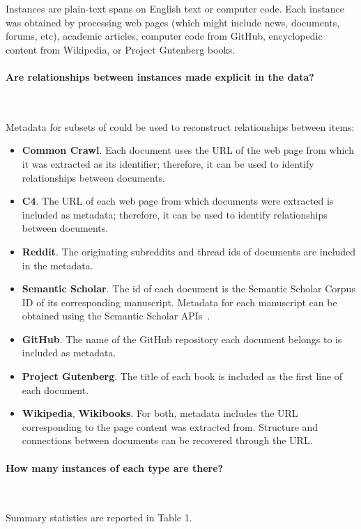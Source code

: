 Instances are plain-text spans on English text or computer code.
Each instance was obtained by processing web pages (which might include news, documents, forums, etc), academic articles, computer code from GitHub, encyclopedic content from Wikipedia, or Project Gutenberg books. 

\paragraph{Are relationships between instances made explicit in the data?}~

Metadata for subsets of \dolma could be used to reconstruct relationships between items:

\begin{itemize}[leftmargin=1em]
    \item \textbf{Common Crawl}. Each document uses the URL of the web page from which it was extracted as its identifier; therefore, it can be used to identify relationships between documents.
    \item \textbf{C4}. The URL of each web page from which documents were extracted is included as metadata; therefore, it can be used to identify relationships between documents.
    \item \textbf{Reddit}. The originating subreddits and thread ids of documents are included in the metadata. 
    \item \textbf{Semantic Scholar}. The id of each document is the Semantic Scholar Corpus ID of its corresponding manuscript. Metadata for each manuscript can be obtained using the Semantic Scholar APIs~\citep{kinney2023semantic}.
    \item \textbf{GitHub}. The name of the GitHub repository each document belongs to is included as metadata. 
    \item \textbf{Project Gutenberg}. The title of each book is included as the first line of each document.
    \item \textbf{Wikipedia}, \textbf{Wikibooks}. For both, metadata includes the URL corresponding to the page content was extracted from. Structure and connections between documents can be recovered through the URL.
\end{itemize}


\paragraph{How many instances of each type are there?}~

Summary statistics are reported in Table 1.


